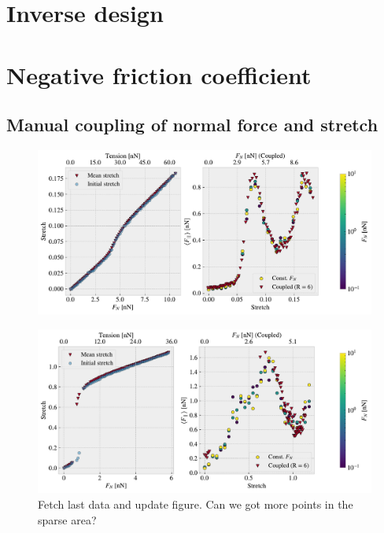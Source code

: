  
\chapter{Inverse design}

\chapter{Negative friction coefficient}
\section{Manual coupling of normal force and stretch}

\begin{figure}[H]
  \centering
  \includegraphics[width=0.9\linewidth]{figures/negative_coefficient/manual_coupling_free_pop1_7_5.pdf}
  \caption{}
  \label{fig:nanomachine}
\end{figure}

\begin{figure}[H]
  \centering
  \includegraphics[width=0.9\linewidth]{figures/negative_coefficient/manual_coupling_free_hon3215.pdf}
  \caption{Fetch last data and update figure. Can we got more points in the sparse area?}
  \label{fig:nanomachine}
\end{figure}





